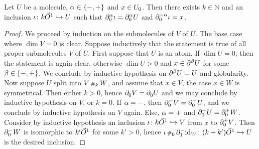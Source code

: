 \begin{lem} \label{lem:path_from_zero_bd_to_all_points}
    Let \( U \) be a molecule, \( \a \in \set{-, +} \) and \( x \in \gr{0}{U} \).
    Then there exists \( k \in \mathbb{N} \) and an inclusion \( \iota \colon k\dglobe{1} \incl U \) such that \( \bd{0}{\a} \iota = \bd{0}{\a} U \) and \( \bd{0}{-\a} \iota = x \).
\end{lem}
\begin{proof}
    We proceed by induction on the submolecules of \( V \) of \( U \).
    The base case where \( \dim V = 0 \) is clear.
    Suppose inductively that the statement is true of all proper submolecules \( V \) of \( U \).
    First suppose that \( U \) is an atom.
    If \( \dim U = 0 \), then the statement is again clear, otherwise \( \dim U > 0 \) and \( x \in \bd{}{\beta} U \) for some \( \beta \in \set{-, +} \).
    We conclude by inductive hypothesis on \( \bd{}{\beta} U \submol U \) and globularity.
    Now suppose \( U \) split into \( V \cp{k} W \), and assume that \( x \in V \), the case \( x \in W \) is symmetrical.
    Then either \( k > 0 \), hence \( \bd{0}{} V = \bd{0}{} U \) and we may conclude by inductive hypothesis on \( V \), or \( k = 0 \).
    If \( \a = - \), then \( \bd{0}{-} V = \bd{0}{-} U \), and we conclude by inductive hypothesis on \( V \) again.
    Else, \( \a = + \) and \( \bd{0}{+} U = \bd{0}{+} W \).
    Consider by inductive hypothesis an inclusion \( \iota \colon k\dglobe{1} \incl V \) from \( x \) to \( \bd{0}{+} V \).
    Then \( \bd{0}{-} W \) is isomorphic to \( k'\dglobe{1} \) for some \( k' > 0 \), hence \( \iota \cp{0} \bd{1}{-} \idd{W} \colon (k + k') \dglobe{1} \incl U \) is the desired inclusion.
\end{proof}

